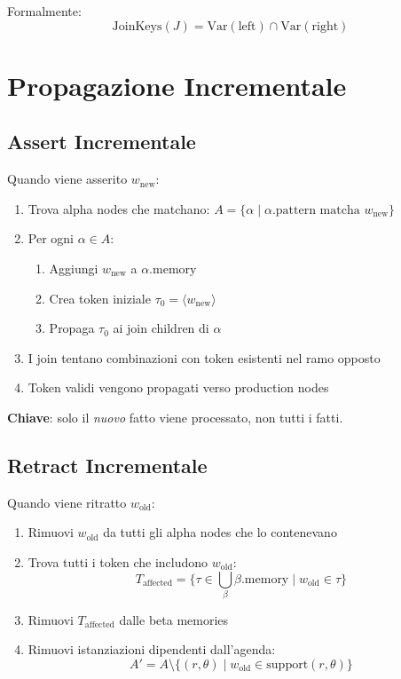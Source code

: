 Formalmente:
\begin{equation}
\text{JoinKeys}(J) = \text{Var}(\text{left}) \cap \text{Var}(\text{right})
\end{equation}

\section{Propagazione Incrementale}

\subsection{Assert Incrementale}

Quando viene asserito $w_{\text{new}}$:

\begin{enumerate}
\item Trova alpha nodes che matchano: $A = \{\alpha \mid \alpha.\text{pattern} \text{ matcha } w_{\text{new}}\}$
\item Per ogni $\alpha \in A$:
   \begin{enumerate}
   \item Aggiungi $w_{\text{new}}$ a $\alpha.\text{memory}$
   \item Crea token iniziale $\tau_0 = \langle w_{\text{new}} \rangle$
   \item Propaga $\tau_0$ ai join children di $\alpha$
   \end{enumerate}
\item I join tentano combinazioni con token esistenti nel ramo opposto
\item Token validi vengono propagati verso production nodes
\end{enumerate}

\textbf{Chiave}: solo il \textit{nuovo} fatto viene processato, non tutti i fatti.

\subsection{Retract Incrementale}

Quando viene ritratto $w_{\text{old}}$:

\begin{enumerate}
\item Rimuovi $w_{\text{old}}$ da tutti gli alpha nodes che lo contenevano
\item Trova tutti i token che includono $w_{\text{old}}$:
   \begin{equation}
   T_{\text{affected}} = \{\tau \in \bigcup_\beta \beta.\text{memory} \mid w_{\text{old}} \in \tau\}
   \end{equation}
\item Rimuovi $T_{\text{affected}}$ dalle beta memories
\item Rimuovi istanziazioni dipendenti dall'agenda:
   \begin{equation}
   A' = A \setminus \{(r, \theta) \mid w_{\text{old}} \in \text{support}(r, \theta)\}
   \end{equation}
\end{enumerate}

